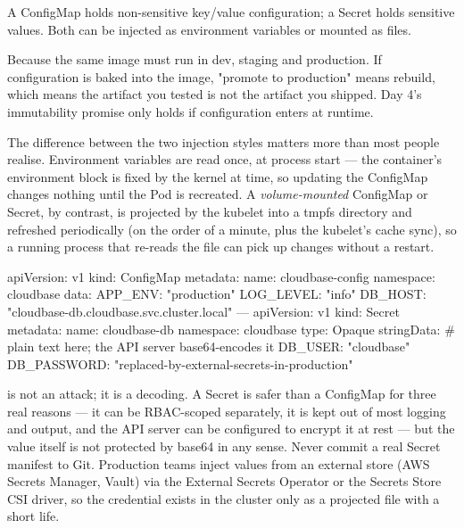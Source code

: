 
 A ConfigMap holds non-sensitive key/value configuration; a Secret holds sensitive values. Both can be injected as environment variables or mounted as files.

 Because the same image must run in dev, staging and production. If configuration is baked into the image, "promote to production" means rebuild, which means the artifact you tested is not the artifact you shipped. Day 4's immutability promise only holds if configuration enters at runtime.

 The difference between the two injection styles matters more than most people realise. Environment variables are read once, at process start --- the container's environment block is fixed by the kernel at  time, so updating the ConfigMap changes nothing until the Pod is recreated. A \emph{volume-mounted} ConfigMap or Secret, by contrast, is projected by the kubelet into a tmpfs directory and refreshed periodically (on the order of a minute, plus the kubelet's cache sync), so a running process that re-reads the file can pick up changes without a restart.

\begin{k8sbox}
apiVersion: v1
kind: ConfigMap
metadata:
  name: cloudbase-config
  namespace: cloudbase
data:
  APP_ENV: "production"
  LOG_LEVEL: "info"
  DB_HOST: "cloudbase-db.cloudbase.svc.cluster.local"
---
apiVersion: v1
kind: Secret
metadata:
  name: cloudbase-db
  namespace: cloudbase
type: Opaque
stringData:              # plain text here; the API server base64-encodes it
  DB_USER: "cloudbase"
  DB_PASSWORD: "replaced-by-external-secrets-in-production"
\end{k8sbox}

\begin{secwarn}
 is not an attack; it is a decoding. A Secret is safer than a ConfigMap for three real reasons --- it can be RBAC-scoped separately, it is kept out of most logging and  output, and the API server can be configured to encrypt it at rest --- but the value itself is not protected by base64 in any sense. Never commit a real Secret manifest to Git. Production teams inject values from an external store (AWS Secrets Manager, Vault) via the External Secrets Operator or the Secrets Store CSI driver, so the credential exists in the cluster only as a projected file with a short life.
\end{secwarn}

